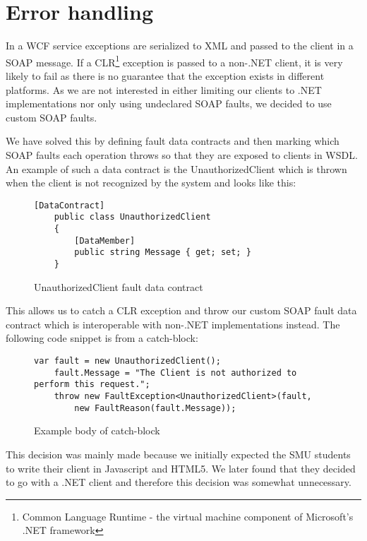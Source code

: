 \documentclass[../report.tex]{subfiles}
\begin{document}
\section{Error handling}
In a WCF service exceptions are serialized to XML and passed to the client in a SOAP message. If a CLR\footnote{Common Language Runtime - the virtual machine component of Microsoft's .NET framework} exception is passed to a non-.NET client, it is very likely to fail as there is no guarantee that the exception exists in different platforms. As we are not interested in either limiting our clients to .NET implementations nor only using undeclared SOAP faults, we decided to use custom SOAP faults. 

We have solved this by defining fault data contracts and then marking which SOAP faults each operation throws so that they are exposed to clients in WSDL. An example of such a data contract is the UnauthorizedClient which is thrown when the client is not recognized by the system and looks like this:

\begin{figure}[H]
\begin{lstlisting}[frame=single]
    [DataContract]
    public class UnauthorizedClient
    {
        [DataMember]
        public string Message { get; set; }
    }
\end{lstlisting}
\caption{UnauthorizedClient fault data contract}
\end{figure}

This allows us to catch a CLR exception and throw our custom SOAP fault data contract which is interoperable with non-.NET implementations instead. The following code snippet is from a catch-block:

\begin{figure}[H]
\begin{lstlisting}[frame=single]
    var fault = new UnauthorizedClient();
    fault.Message = "The Client is not authorized to perform this request.";
    throw new FaultException<UnauthorizedClient>(fault, 
        new FaultReason(fault.Message));
\end{lstlisting}
\caption{Example body of catch-block}
\end{figure}

This decision was mainly made because we initially expected the SMU students to write their client in Javascript and HTML5. We later found that they decided to go with a .NET client and therefore this decision was somewhat unnecessary. 
\end{document}
